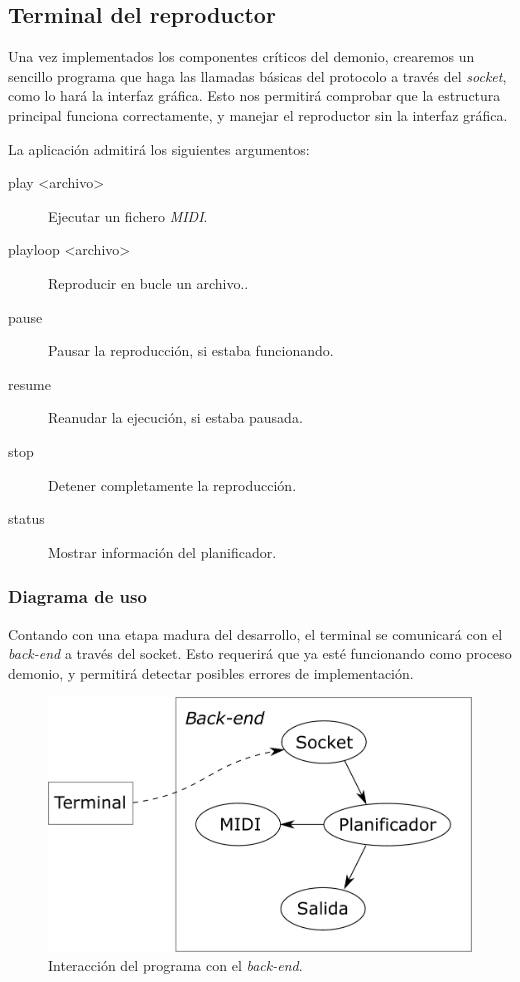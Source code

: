 \smallskip

\subsection{Terminal del reproductor}

Una vez implementados los componentes críticos del demonio, crearemos un sencillo programa que haga las llamadas básicas del protocolo a través del \textit{socket}, como lo hará la interfaz gráfica. Esto nos permitirá comprobar que la estructura principal funciona correctamente, y manejar el reproductor sin la interfaz gráfica.

La aplicación admitirá los siguientes argumentos:

\begin{description}
	\item[play <archivo>] Ejecutar un fichero \textit{MIDI}.
	\item[playloop <archivo>] Reproducir en bucle un archivo..
	\item[pause] Pausar la reproducción, si estaba funcionando.
	\item[resume] Reanudar la ejecución, si estaba pausada.
	\item[stop] Detener completamente la reproducción.
	\item[status] Mostrar información del planificador.
\end{description}

\subsubsection{Diagrama de uso}

Contando con una etapa madura del desarrollo, el terminal se comunicará con el \textit{back-end} a través del socket. Esto requerirá que ya esté funcionando como proceso demonio, y permitirá detectar posibles errores de implementación.

\smallskip

\begin{figure}[H]
	\noindent \begin{centering}
		\includegraphics[width=\linewidth/2]{capitulo4/terminal}
		\par\end{centering}
	\smallskip
	\caption{\label{fig:terminal} Interacción del programa con el \textit{back-end}.}
\end{figure} 

